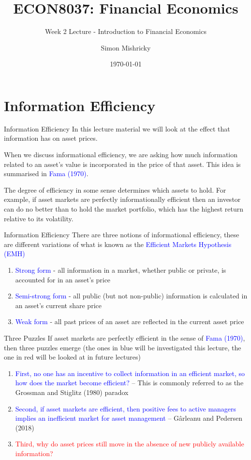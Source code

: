 \documentclass[aspectratio=169,xcolor=dvipsnames]{beamer}
\title{ECON8037: Financial Economics}
\subtitle{\normalsize Week 2 Lecture - Introduction to Financial Economics}
\author{Simon Mishricky}
\institute{Research School of Economics, Australian National University}
\date{\today}
\begin{document}
\section{Information Efficiency}
\frame{\titlepage}

\begin{frame}{Information Efficiency}
    In this lecture material we will look at the effect that information has on asset prices.

    When we discuss informational efficiency, we are asking how much information related to an asset's value is incorporated in the price of that asset. This idea is summarised in \textcolor{blue}{Fama (1970)}.

    The degree of efficiency in some sense determines which assets to hold. For example, if asset markets are perfectly informationally efficient then an investor can do no better than to hold the market portfolio, which has the highest return relative to its volatility.
\end{frame}

\begin{frame}{Information Efficiency}
    There are three notions of informational efficiency, these are different variations of what is known as the \textcolor{blue}{Efficient Markets Hypothesis (EMH)}
    \begin{enumerate}
        \item \textcolor{blue}{Strong form} - all information in a market, whether public or private, is accounted for in an asset's price
        \item \textcolor{blue}{Semi-strong form} - all public (but not non-public) information is calculated in an asset's current share price
        \item \textcolor{blue}{Weak form} - all past prices of an asset are reflected in the current asset price
    \end{enumerate}
\end{frame}

\begin{frame}{Three Puzzles}
    If asset markets are perfectly efficient in the sense of \textcolor{blue}{Fama (1970)}, then three puzzles emerge (the ones in blue will be investigated this lecture, the one in red will be looked at in future lectures)
    \begin{enumerate}
        \item \textcolor{blue}{First, no one has an incentive to collect information in an efficient market, so how does the market become efficient?} -- This is commonly referred to as the Grossman and Stiglitz (1980) paradox
        \item \textcolor{blue}{Second, if asset markets are efficient, then positive fees to active managers implies an inefficient market for asset management} -- G\^arleanu and Pedersen (2018)
        \item \textcolor{red}{Third, why do asset prices still move in the absence of new publicly available information?}
    \end{enumerate}
\end{frame}
\end{document}
